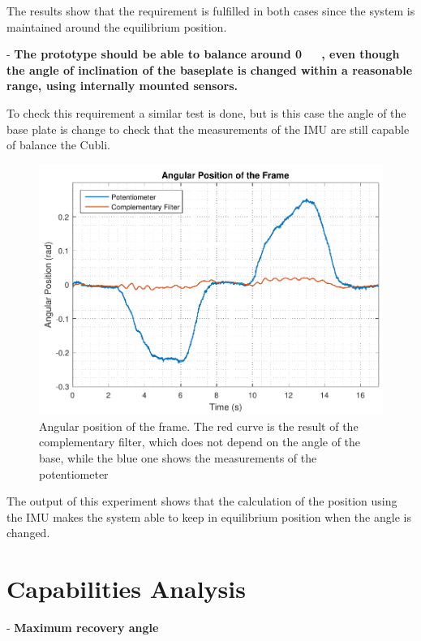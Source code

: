 The results show that the requirement is fulfilled in both cases since the system is maintained around the equilibrium position.

- \textbf{The prototype should be able to balance around \si{0\ \rad}, even though the angle of inclination of the baseplate is changed within a reasonable range, using internally mounted sensors.}

To check this requirement a similar test is done, but is this case the angle of the base plate is change to check that the measurements of the IMU are  still capable of balance the Cubli.
\begin{figure}[H]
	\centering
	\includegraphics[scale=0.62]{figures/testReq2}
	\caption{Angular position of the frame. The red curve is the result of the complementary filter, which does not depend on the angle of the base, while the blue one shows the measurements of the potentiometer}
	\label{testReq2}
\end{figure}\vspace{-5mm}
%
The output of this experiment shows that the calculation of the position using the IMU makes the system able to keep in equilibrium position when the angle is changed.


\section{Capabilities Analysis}
- \textbf{Maximum recovery angle}

